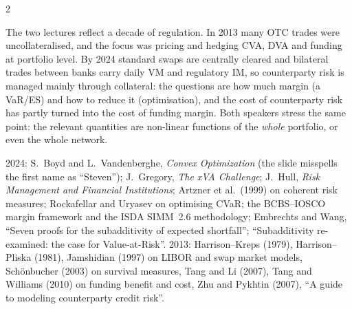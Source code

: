 \begin{paracol}{2}
\begin{coursenote}[2013 versus 2024]
The two lectures reflect a decade of regulation. In 2013 many OTC trades were uncollateralised, and the focus was
pricing and hedging CVA, DVA and funding at portfolio level. By 2024 standard swaps are centrally cleared and
bilateral trades between banks carry daily VM and regulatory IM, so counterparty risk is managed mainly through
collateral: the questions are how much margin (a VaR/ES) and how to reduce it (optimisation), and the cost of
counterparty risk has partly turned into the cost of funding margin. Both speakers stress the same point: the
relevant quantities are non-linear functions of the \emph{whole} portfolio, or even the whole network.
\end{coursenote}

\begin{coursenote}
2024: S.~Boyd and L.~Vandenberghe, \emph{Convex Optimization} (the slide misspells the first name as ``Steven'');
J.~Gregory, \emph{The xVA Challenge}; J.~Hull, \emph{Risk Management and Financial Institutions}; Artzner et al.\
(1999) on coherent risk measures; Rockafellar and Uryasev on optimising CVaR; the BCBS--IOSCO margin framework and
the ISDA SIMM~2.6 methodology; Embrechts and Wang, ``Seven proofs for the subadditivity of expected shortfall'';
``Subadditivity re-examined: the case for Value-at-Risk''. 2013: Harrison--Kreps (1979), Harrison--Pliska (1981),
Jamshidian (1997) on LIBOR and swap market models, Sch\"onbucher (2003) on survival measures, Tang and Li (2007),
Tang and Williams (2010) on funding benefit and cost, Zhu and Pykhtin (2007), ``A guide to modeling counterparty
credit risk''.
\end{coursenote}


\end{paracol}
